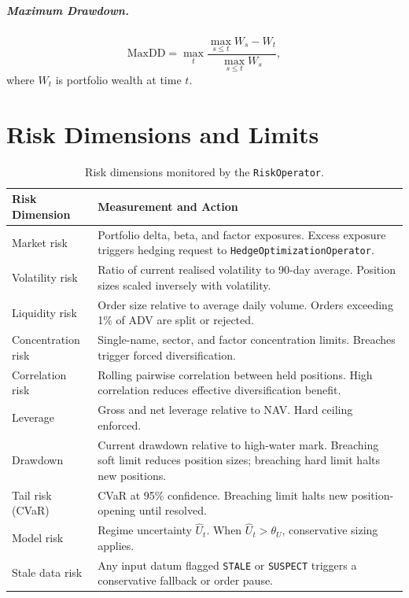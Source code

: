 \documentclass[12pt,openany]{book}
\numberwithin{equation}{chapter}
\theoremstyle{plain}
\theoremstyle{definition}
\theoremstyle{remark}
\begin{document}
\subparagraph{Maximum Drawdown.}
\begin{equation}
    \text{MaxDD} = \max_{t} \frac{\max_{s \leq t} W_s - W_t}{\max_{s \leq t} W_s},
\end{equation}
where $W_t$ is portfolio wealth at time $t$.

\section{Risk Dimensions and Limits}

\begin{table}[H]
\centering
\caption{Risk dimensions monitored by the \texttt{RiskOperator}.}
\label{tab:risk_dimensions}
\small
\begin{tabularx}{\textwidth}{p{4.0cm} p{10.5cm}}
\toprule
\textbf{Risk Dimension} & \textbf{Measurement and Action} \\
\midrule
Market risk &
    Portfolio delta, beta, and factor exposures. Excess exposure triggers
    hedging request to \texttt{HedgeOptimizationOperator}. \\
\midrule
Volatility risk &
    Ratio of current realised volatility to 90-day average. Position sizes
    scaled inversely with volatility. \\
\midrule
Liquidity risk &
    Order size relative to average daily volume. Orders exceeding 1\% of ADV
    are split or rejected. \\
\midrule
Concentration risk &
    Single-name, sector, and factor concentration limits. Breaches trigger
    forced diversification. \\
\midrule
Correlation risk &
    Rolling pairwise correlation between held positions. High correlation
    reduces effective diversification benefit. \\
\midrule
Leverage &
    Gross and net leverage relative to NAV. Hard ceiling enforced. \\
\midrule
Drawdown &
    Current drawdown relative to high-water mark. Breaching soft limit
    reduces position sizes; breaching hard limit halts new positions. \\
\midrule
Tail risk (CVaR) &
    CVaR at 95\% confidence. Breaching limit halts new position-opening
    until resolved. \\
\midrule
Model risk &
    Regime uncertainty $\hat{U}_t$. When $\hat{U}_t > \theta_U$,
    conservative sizing applies. \\
\midrule
Stale data risk &
    Any input datum flagged \texttt{STALE} or \texttt{SUSPECT} triggers
    a conservative fallback or order pause. \\
\bottomrule
\end{tabularx}
\end{table}
\end{document}
